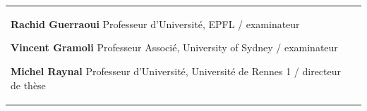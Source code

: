\begin{titlepage}
\begin{center}
\begin{minipage}{\glarg}
\begin{tabular}{p{7cm}p{10cm}}
\begin{minipage}{\plarg}
{\Large\bf Rachid Guerraoui\vspace{0mm}\newline}
{ Professeur d'Universit{\'e}, EPFL \!/\! examinateur \vspace{-2mm}\newline}

{\Large\bf Vincent Gramoli \vspace{0mm}\newline}
{ Professeur Associ{\'e}, University of Sydney \!/\! examinateur\vspace{-2mm}\newline}

{\Large\bf Michel Raynal \vspace{0mm}\newline}
{ Professeur d'Universit{\'e}, Universit{\'e} de Rennes 1 \!/\! directeur de th\`ese\vspace{-2mm}\newline}



\end{minipage}
\end{tabular}

\end{minipage}
\end{center}
\end{titlepage}

